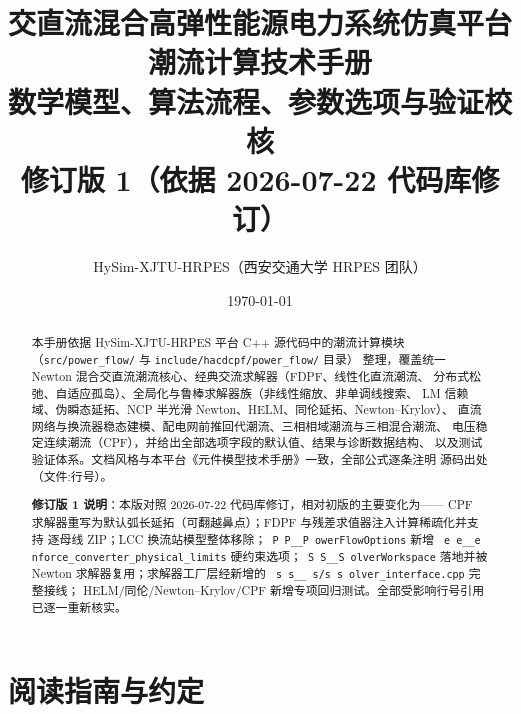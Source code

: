 \documentclass[UTF8,fontset=windows,a4paper,11pt]{ctexart}
\title{\textbf{交直流混合高弹性能源电力系统仿真平台}\\[0.5em]
       {\Large 潮流计算技术手册}\\[0.3em]
       {\large 数学模型、算法流程、参数选项与验证校核}\\[0.3em]
       {\large 修订版 1（依据 2026-07-22 代码库修订）}}
\author{HySim-XJTU-HRPES（西安交通大学 HRPES 团队）}
\date{\today}
\makeatletter
\newcommand{\fld}[1]{\texttt{\fld@scan#1\fld@stop}}
\def\fld@scan#1{%
  \ifx#1\fld@stop
  \else
    \ifx#1\_\_\allowbreak\else#1\fi
    \expandafter\fld@scan
  \fi}
\newcommand{\srcpath}[1]{\texttt{\src@scan#1\src@stop}}
\def\src@scan#1{%
  \ifx#1\src@stop
  \else
    \ifx#1\_\_\allowbreak\else
    \ifx#1/#1\allowbreak\else
    #1\fi\fi
    \expandafter\src@scan
  \fi}
\makeatother
\begin{document}
\maketitle
\begin{abstract}
\noindent 本手册依据 HySim-XJTU-HRPES 平台 C++ 源代码中的潮流计算模块
（\texttt{src/\allowbreak power\_flow/} 与 \texttt{include/\allowbreak hacdcpf/\allowbreak power\_flow/} 目录）
整理，覆盖统一 Newton 混合交直流潮流核心、经典交流求解器（FDPF、线性化直流潮流、
分布式松弛、自适应孤岛）、全局化与鲁棒求解器族（非线性缩放、非单调线搜索、
LM 信赖域、伪瞬态延拓、NCP 半光滑 Newton、HELM、同伦延拓、Newton--Krylov）、
直流网络与换流器稳态建模、配电网前推回代潮流、三相相域潮流与三相混合潮流、
电压稳定连续潮流（CPF），并给出全部选项字段的默认值、结果与诊断数据结构、
以及测试验证体系。文档风格与本平台《元件模型技术手册》一致，全部公式逐条注明
源码出处（文件:行号）。

\smallskip
\noindent\textbf{修订版 1 说明}：本版对照 2026-07-22 代码库修订，相对初版的主要变化为——
CPF 求解器重写为默认弧长延拓（可翻越鼻点）；FDPF 与残差求值器注入计算稀疏化并支持
逐母线 ZIP；LCC 换流站模型整体移除；\fld{PowerFlowOptions} 新增
\fld{enforce\_converter\_physical\_limits} 硬约束选项；\fld{SolverWorkspace} 落地并被
Newton 求解器复用；求解器工厂层经新增的 \srcpath{solver\_interface.cpp} 完整接线；
HELM/同伦/Newton--Krylov/CPF 新增专项回归测试。全部受影响行号引用已逐一重新核实。
\end{abstract}

\tableofcontents
\newpage

\section{阅读指南与约定}
\end{document}
